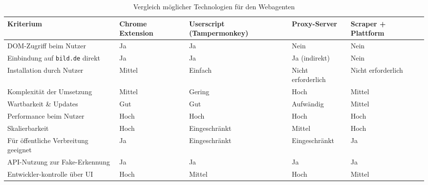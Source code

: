 \begin{table}[htbp]
    \centering
    \renewcommand{\arraystretch}{1.3}
    \begin{tabular}{|p{2.5cm}|p{2.5cm}|p{2.5cm}|p{2.5cm}|p{2.5cm}|}
        \hline
        \rowcolor{lightgray} \textbf{Kriterium} & \textbf{Chrome Extension} & \textbf{Userscript (Tampermonkey)} & \textbf{Proxy-Server} & \textbf{Scraper + Plattform} \\
        \hline
        DOM-Zugriff beim Nutzer & Ja & Ja & Nein & Nein \\
        \hline
        Einbindung auf \texttt{bild.de} direkt & Ja & Ja & Ja (indirekt) & Nein \\
        \hline
        Installation durch Nutzer & Mittel & Einfach & Nicht erforderlich & Nicht erforderlich\\
        \hline
        Komplexität der Umsetzung & Mittel & Gering & Hoch & Mittel \\
        \hline
        Wartbarkeit \& Updates & Gut & Gut & Aufwändig & Mittel \\
        \hline
        Performance beim Nutzer & Hoch & Hoch & Hoch & Hoch \\
        \hline
        Skalierbarkeit & Hoch & Eingeschränkt & Mittel & Hoch \\
        \hline
        Für öffentliche Verbreitung geeignet & Ja & Eingeschränkt & Eingeschränkt & Ja \\
        \hline
        API-Nutzung zur Fake-Erkennung & Ja & Ja & Ja & Ja \\
        \hline
        Entwickler-kontrolle über UI & Hoch & Mittel & Hoch & Mittel \\
        \hline
    \end{tabular}
    \caption{Vergleich möglicher Technologien für den Webagenten}
    \label{table:technischeAnsaetze}
\end{table}



